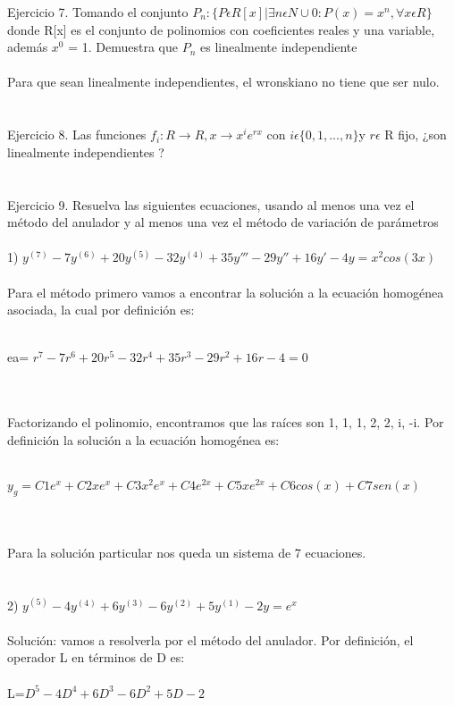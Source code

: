 \documentclass[a4paper,10pt]{article}
\begin{document}
Ejercicio 7. Tomando el conjunto $P_n : \{P \epsilon R[x]  | \exists n \epsilon N \cup {0} : P(x) = x^n, \forall x \epsilon R \}$ donde R[x] es el conjunto de polinomios con coeficientes reales y una variable, además $x^0$ = 1. Demuestra que $P_n$ es linealmente independiente\\\\
Para que sean linealmente independientes, el wronskiano no tiene que ser nulo.\\\\\\
Ejercicio 8. Las funciones $f_i : R \rightarrow R, x \rightarrow x^ i e^{rx}$ con $i\epsilon \{0, 1, . . . , n\} $y $r \epsilon$ R fijo, ¿son linealmente independientes ?\\\\\\
Ejercicio 9. Resuelva las siguientes ecuaciones, usando al menos una vez el método del anulador y al menos una vez el método de variación de parámetros\\\\
1) $y^{(7)} - 7y^{(6 )} + 20y^{(5)} - 32y^{(4)} + 35y''' - 29y'' + 16y' - 4y = x^2 cos(3x)$\\\\
Para el método primero vamos a encontrar la solución a la ecuación homogénea asociada, la cual por definición es:\\\\
\centerline{ea= $ r^{7} - 7r^{6 } + 20r^{5} - 32r^{4} + 35r^3 - 29r^2 + 16r - 4 =0$}\\\\
Factorizando el polinomio, encontramos que las raíces son { 1, 1, 1, 2, 2, i, -i}. Por definición la solución a la ecuación homogénea es:\\\\
\centerline{$y_g = C1e^x + C2xe^x + C3x^2 e^x + C4e^{2x} + C5xe^{2x} + C6cos(x) + C7sen(x)$}\\\\
Para la solución particular nos queda un sistema de 7 ecuaciones.\\\\\\
2) $y^{(5)} - 4y^{(4)} + 6y^{(3)} - 6y^{(2)} + 5y^{(1)} - 2y = e^x $ \\\\
Solución: vamos a resolverla por el método del anulador. Por definición, el operador L en términos de D es:\\\\
L=$D^5 - 4D^4 + 6D^3 - 6D^2 + 5D - 2$\\\\
\end{document}
